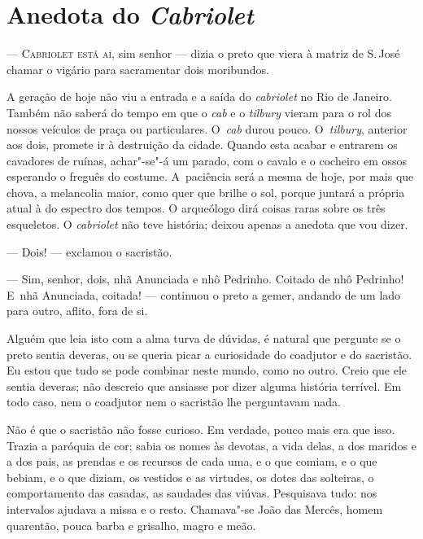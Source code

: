 \begin{linenumbers}
\end{linenumbers}

\chapter{Anedota do \emph{Cabriolet}}

\begin{linenumbers}

\textsc{--- Cabriolet está aí,} sim senhor --- dizia o preto que viera à
matriz de S.\,José chamar o vigário para sacramentar dois moribundos.

A geração de hoje não viu a entrada e a saída do \emph{cabriolet} no Rio
de Janeiro. Também não saberá do tempo em que o \emph{cab} e o
\emph{tilbury} vieram para o rol dos nossos veículos de praça ou
particulares. O~\emph{cab} durou pouco. O~\emph{tilbury}, anterior aos
dois, promete ir à destruição da cidade. Quando esta acabar e entrarem
os cavadores de ruínas, achar"-se"-á um parado, com o cavalo e o cocheiro
em ossos esperando o freguês do costume. A~paciência será a mesma de
hoje, por mais que chova, a melancolia maior, como quer que brilhe o
sol, porque juntará a própria atual à do espectro dos tempos. O
arqueólogo dirá coisas raras sobre os três esqueletos. O
\emph{cabriolet} não teve história; deixou apenas a anedota que vou
dizer.

--- Dois! --- exclamou o sacristão.

--- Sim, senhor, dois, nhã Anunciada e nhô Pedrinho. Coitado de nhô
Pedrinho! E~nhã Anunciada, coitada! --- continuou o preto a gemer,
andando de um lado para outro, aflito, fora de si.

Alguém que leia isto com a alma turva de dúvidas, é natural que pergunte
se o preto sentia deveras, ou se queria picar a curiosidade do coadjutor
e do sacristão. Eu estou que tudo se pode combinar neste mundo, como no
outro. Creio que ele sentia deveras; não descreio que ansiasse por dizer
alguma história terrível. Em todo caso, nem o coadjutor nem o sacristão
lhe perguntavam nada.

Não é que o sacristão não fosse curioso. Em verdade, pouco mais era que
isso. Trazia a paróquia de cor; sabia os nomes às devotas, a vida delas,
a dos maridos e a dos pais, as prendas e os recursos de cada uma, e o
que comiam, e o que bebiam, e o que diziam, os vestidos e as virtudes,
os dotes das solteiras, o comportamento das casadas, as saudades das
viúvas. Pesquisava tudo: nos intervalos ajudava a missa e o resto.
Chamava"-se João das Mercês, homem quarentão, pouca barba e grisalho,
magro e meão.


\end{linenumbers}
